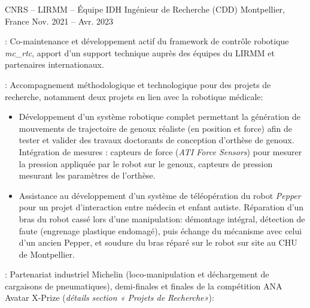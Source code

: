 \begin{cventries}
{\begin{cvitems}
      \end{cvitems}
    }
\cventry
    {CNRS -- LIRMM -- Équipe IDH} %
    {Ingénieur de Recherche (CDD)} %
    {Montpellier, France} %
    {Nov. 2021 -- Avr. 2023} %
    {
      \begin{cvitems} %
        \item {} : Co-maintenance et développement actif du framework de contrôle robotique \emph{mc\_rtc}, apport d'un support technique auprès des équipes du LIRMM et partenaires internationaux.
        \item {} : Accompagnement méthodologique et technologique pour des projets de recherche, notamment deux projets en lien avec la robotique médicale:
        \begin{itemize}
        \item Développement d'un système robotique complet permettant la génération de mouvements de trajectoire de genoux réaliste (en position et force) afin de tester et valider des travaux doctorants de conception d'orthèse de genoux. Intégration de mesures : capteurs de force (\emph{ATI Force Sensors}) pour mesurer la pression appliquée par le robot sur le genoux, capteurs de pression mesurant les paramètres de l'orthèse.
        \item Assistance au développement d'un système de téléopération du robot \emph{Pepper} pour un projet d'interaction entre médecin et enfant autiste. Réparation d'un bras du robot cassé lors d'une manipulation: démontage intégral, détection de faute (engrenage plastique endomagé), puis échange du mécanisme avec celui d'un ancien Pepper, et soudure du bras réparé sur le robot sur site au CHU de Montpellier.
        \end{itemize}
        \item {} : Partenariat industriel Michelin (loco-manipulation et déchargement de cargaisons de pneumatiques), demi-finales et finales de la compétition ANA Avatar X-Prize (\emph{détails section « Projets de Recherche»}):
      \end{cvitems}
    }


\end{cventries}
